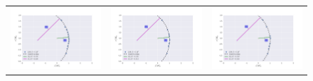\begin{figure}
\begin{tabular}{@{}c@{}c@{}c@{}}
\includegraphics[clip]{./Figures/LV-bowshocks-xyfancy-positionswill-LV4} & \includegraphics[clip]{./Figures/LV-bowshocks-xyfancy-positionssamp00-LV4} & \includegraphics[clip]{./Figures/LV-bowshocks-xyfancy-positionssamp01-LV4} \\

\end{tabular}
\end{figure}

